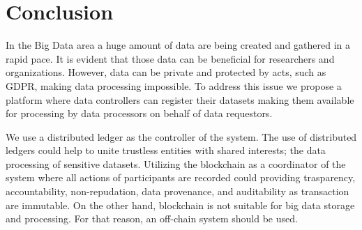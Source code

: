 \chapter{Conclusion}
\label{conclusion}

In the Big Data area a huge amount of data are being created and gathered in a rapid pace. It is evident that those data can be beneficial for researchers and organizations. However, data can be private and protected by acts, such as GDPR, making data processing impossible. To address this issue we propose a platform where data controllers can register their datasets making them available for processing by data processors on behalf of data requestors.

We use a distributed ledger as the controller of the system. The use of distributed ledgers could help to unite trustless entities with shared interests; the data processing of sensitive datasets. Utilizing the blockchain as a coordinator of the system where all actions of participants are recorded could providing trasparency, accountability, non-repudation, data provenance, and auditability as transaction are immutable. On the other hand, blockchain is not suitable for big data storage and processing. For that reason, an off-chain system should be used.
